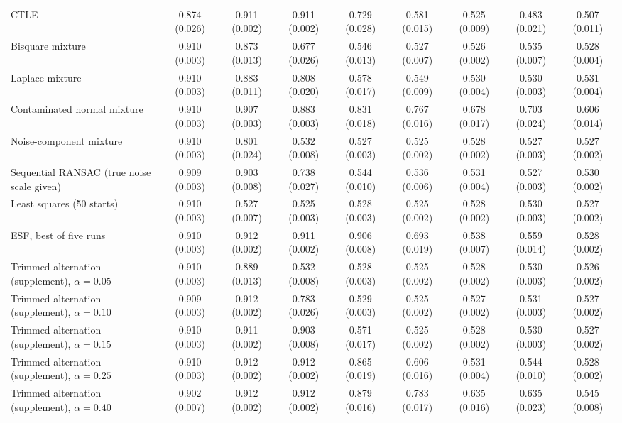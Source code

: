 \begin{table}[htbp]
{\begin{tabular}{lcccccccc}
CTLE & 0.874 (0.026) & 0.911 (0.002) & 0.911 (0.002) & 0.729 (0.028) & 0.581 (0.015) & 0.525 (0.009) & 0.483 (0.021) & 0.507 (0.011) \\
Bisquare mixture & 0.910 (0.003) & 0.873 (0.013) & 0.677 (0.026) & 0.546 (0.013) & 0.527 (0.007) & 0.526 (0.002) & 0.535 (0.007) & 0.528 (0.004) \\
Laplace mixture & 0.910 (0.003) & 0.883 (0.011) & 0.808 (0.020) & 0.578 (0.017) & 0.549 (0.009) & 0.530 (0.004) & 0.530 (0.003) & 0.531 (0.004) \\
Contaminated normal mixture & 0.910 (0.003) & 0.907 (0.003) & 0.883 (0.003) & 0.831 (0.018) & 0.767 (0.016) & 0.678 (0.017) & 0.703 (0.024) & 0.606 (0.014) \\
Noise-component mixture & 0.910 (0.003) & 0.801 (0.024) & 0.532 (0.008) & 0.527 (0.003) & 0.525 (0.002) & 0.528 (0.002) & 0.527 (0.003) & 0.527 (0.002) \\
Sequential RANSAC (true noise scale given) & 0.909 (0.003) & 0.903 (0.008) & 0.738 (0.027) & 0.544 (0.010) & 0.536 (0.006) & 0.531 (0.004) & 0.527 (0.003) & 0.530 (0.002) \\
Least squares (50 starts) & 0.910 (0.003) & 0.527 (0.007) & 0.525 (0.003) & 0.528 (0.003) & 0.525 (0.002) & 0.528 (0.002) & 0.530 (0.003) & 0.527 (0.002) \\
ESF, best of five runs & 0.910 (0.003) & 0.912 (0.002) & 0.911 (0.002) & 0.906 (0.008) & 0.693 (0.019) & 0.538 (0.007) & 0.559 (0.014) & 0.528 (0.002) \\
Trimmed alternation (supplement), $\alpha=0.05$ & 0.910 (0.003) & 0.889 (0.013) & 0.532 (0.008) & 0.528 (0.003) & 0.525 (0.002) & 0.528 (0.002) & 0.530 (0.003) & 0.526 (0.002) \\
Trimmed alternation (supplement), $\alpha=0.10$ & 0.909 (0.003) & 0.912 (0.002) & 0.783 (0.026) & 0.529 (0.003) & 0.525 (0.002) & 0.527 (0.002) & 0.531 (0.003) & 0.527 (0.002) \\
Trimmed alternation (supplement), $\alpha=0.15$ & 0.910 (0.003) & 0.911 (0.002) & 0.903 (0.008) & 0.571 (0.017) & 0.525 (0.002) & 0.528 (0.002) & 0.530 (0.003) & 0.527 (0.002) \\
Trimmed alternation (supplement), $\alpha=0.25$ & 0.910 (0.003) & 0.912 (0.002) & 0.912 (0.002) & 0.865 (0.019) & 0.606 (0.016) & 0.531 (0.004) & 0.544 (0.010) & 0.528 (0.002) \\
Trimmed alternation (supplement), $\alpha=0.40$ & 0.902 (0.007) & 0.912 (0.002) & 0.912 (0.002) & 0.879 (0.016) & 0.783 (0.017) & 0.635 (0.016) & 0.635 (0.023) & 0.545 (0.008) \\

\end{tabular}}
\end{table}
